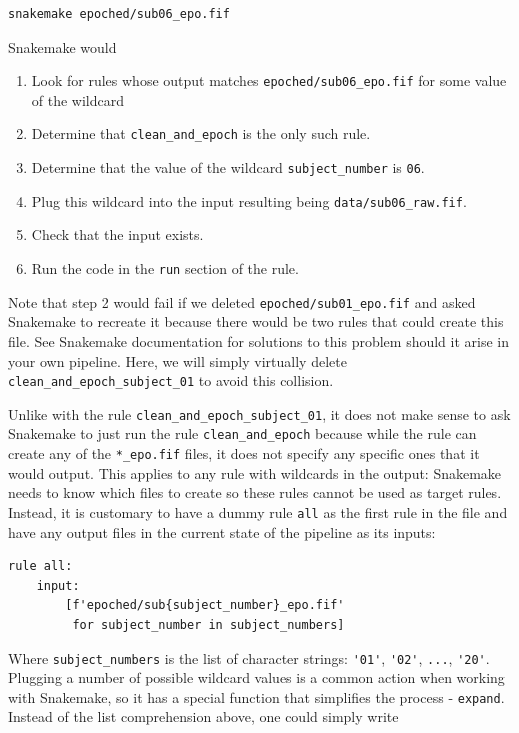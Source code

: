 \documentclass[a4paper,man,floatsintext,natbib]{apa6}
\begin{document}
\begin{verbatim}
snakemake epoched/sub06_epo.fif
\end{verbatim}

Snakemake would

\begin{enumerate}
    \item Look for rules whose output matches \verb|epoched/sub06_epo.fif| for some value of the wildcard
    \item Determine that \verb|clean_and_epoch| is the only such rule.
    \item Determine that the value of the wildcard \verb|subject_number| is \verb|06|.
    \item Plug this wildcard into the input resulting being \verb|data/sub06_raw.fif|.
    \item Check that the input exists.
    \item Run the code in the \verb|run| section of the rule.
\end{enumerate}

Note that step 2 would fail if we deleted \verb|epoched/sub01_epo.fif| and asked Snakemake to recreate it because there would be two rules that could create this file. See Snakemake documentation for solutions to this problem should it arise in your own pipeline. Here, we will simply virtually delete \verb|clean_and_epoch_subject_01| to avoid this collision.

Unlike with the rule \verb|clean_and_epoch_subject_01|, it does not make sense to ask Snakemake to just run the rule \verb|clean_and_epoch| because while the rule can create any of the \verb|*_epo.fif| files, it does not specify any specific ones that it would output. This applies to any rule with wildcards in the output: Snakemake needs to know which files to create so these rules cannot be used as target rules. Instead, it is customary to have a dummy rule \verb|all| as the first rule in the file and have any output files in the current state of the pipeline as its inputs:
\begin{verbatim}
rule all:
    input:
        [f'epoched/sub{subject_number}_epo.fif'
         for subject_number in subject_numbers]
\end{verbatim}

Where \verb|subject_numbers| is the list of character strings: \verb|'01'|, \verb|'02'|, \verb|...|, \verb|'20'|. Plugging a number of possible wildcard values is a common action when working with Snakemake, so it has a special function that simplifies the process - \verb|expand|. Instead of the list comprehension above, one could simply write
\end{document}
